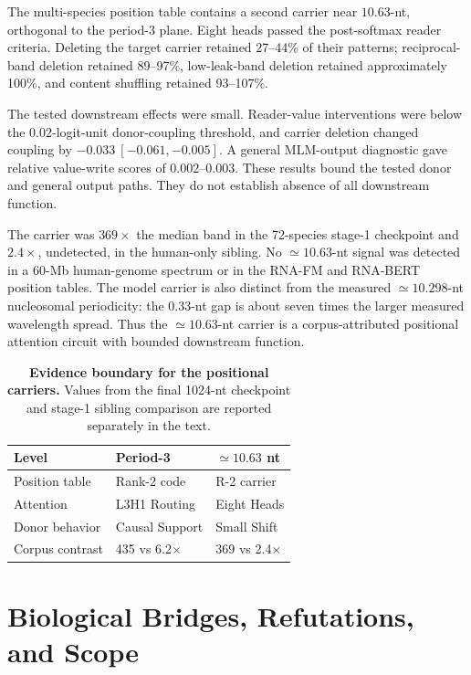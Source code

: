 \documentclass{article}
\begin{document}
The multi-species position table contains a second carrier near \(10.63\)-nt, orthogonal to the period-3 plane. Eight heads passed the post-softmax reader criteria. Deleting the target carrier retained 27--44\% of their patterns; reciprocal-band deletion retained 89--97\%, low-leak-band deletion retained approximately 100\%, and content shuffling retained 93--107\%.

The tested downstream effects were small. Reader-value interventions were below the 0.02-logit-unit donor-coupling threshold, and carrier deletion changed coupling by \(-0.033\ [-0.061,-0.005]\). A general MLM-output diagnostic gave relative value-write scores of \(0.002\)--\(0.003\). These results bound the tested donor and general output paths. They do not establish absence of all downstream function.

The carrier was \(369\times\) the median band in the 72-species stage-1 checkpoint and \(2.4\times\), undetected, in the human-only sibling. No \(\simeq10.63\)-nt signal was detected in a 60-Mb human-genome spectrum or in the RNA-FM and RNA-BERT position tables. The model carrier is also distinct from the measured \(\simeq10.298\)-nt nucleosomal periodicity: the 0.33-nt gap is about seven times the larger measured wavelength spread. Thus the \(\simeq10.63\)-nt carrier is a corpus-attributed positional attention circuit with bounded downstream function.

\begin{table}[t]
  \caption{\textbf{Evidence boundary for the positional carriers.} Values from
  the final 1024-nt checkpoint and stage-1 sibling comparison are reported
  separately in the text.}
  \label{tab:carrier-evidence}
  \centering
  \small
  \begin{tabular}{lll}
    \toprule
    Level & Period-3 & \(\simeq10.63\) nt \\
    \midrule
    Position table & Rank-2 code& R-2 carrier\\
    Attention & L3H1 Routing& Eight Heads\\
    Donor behavior & Causal Support& Small Shift\\
    Corpus contrast & 435 vs 6.2\(\times\) & 369 vs 2.4\(\times\) \\
  \end{tabular}
\end{table}
\section{Biological Bridges, Refutations, and Scope}
\label{sec:biology}
\end{document}
